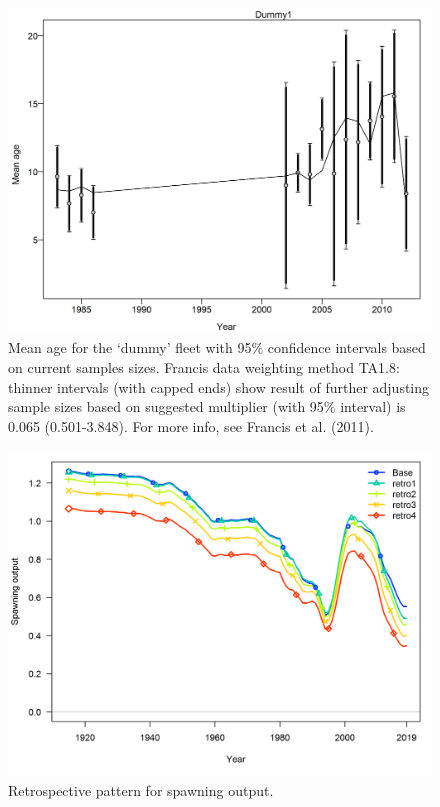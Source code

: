 \documentclass[12pt,]{article}
\begin{document}
\begin{figure}
\centering
\includegraphics{r4ss/plots_mod1/comp_condAALfit_data_weighting_TA1.8_condAgeDummy1.png}
\caption{Mean age for the `dummy' fleet with 95\% confidence intervals
based on current samples sizes. Francis data weighting method TA1.8:
thinner intervals (with capped ends) show result of further adjusting
sample sizes based on suggested multiplier (with 95\% interval) is 0.065
(0.501-3.848). For more info, see Francis et al. (2011).
\label{fig:comp_condAALfit_data_weighting_TA1.8_condAgeDummy1}}
\end{figure}

\FloatBarrier

\begin{figure}
\centering
\includegraphics{Figures/retro_spawnb.png}
\caption{Retrospective pattern for spawning output.
\label{fig:retro_spawnb}}
\end{figure}
\end{document}
